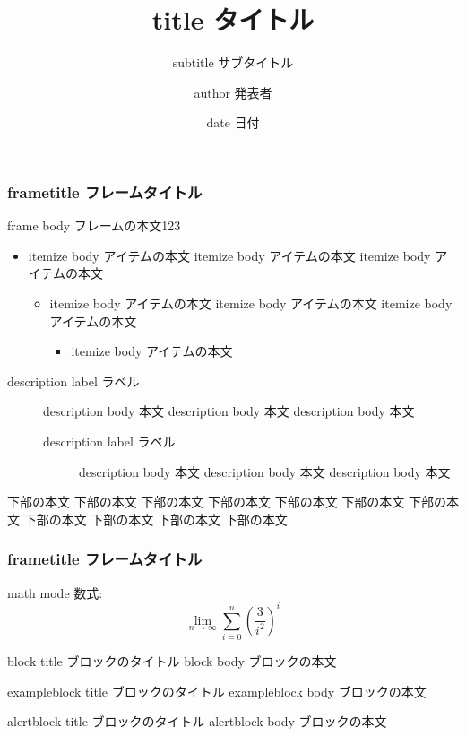 \documentclass[dvipdfmx,14pt,hyperref={hidelinks},t]{beamer}
\title{title タイトル}
\author{author 発表者}
\institute{institute 所属}
\subtitle{subtitle サブタイトル}
\date{date 日付}
\begin{document}
\begin{frame}[plain]
  \titlepage
\end{frame}

\begin{frame}
  \frametitle{frametitle フレームタイトル}
  frame body フレームの本文123
  \begin{itemize}
  \item itemize body アイテムの本文 itemize body アイテムの本文 itemize body アイテムの本文
    \begin{itemize}
    \item itemize body アイテムの本文 itemize body アイテムの本文 itemize body アイテムの本文
      \begin{itemize}
      \item  itemize body アイテムの本文
      \end{itemize}
    \end{itemize}
  \end{itemize}
  \begin{description}
  \item[description label ラベル] description body 本文 description body 本文 description body 本文
    \begin{description}
    \item[description label ラベル] description body 本文 description body 本文 description body 本文
    \end{description}
  \end{description}
  下部の本文 下部の本文 下部の本文 下部の本文 下部の本文 下部の本文 下部の本文 下部の本文 下部の本文 下部の本文 下部の本文
\end{frame}

\begin{frame}[fragile]
  \frametitle{frametitle フレームタイトル}
  math mode 数式:
  \[
    \lim_{n\to\infty}\sum_{i=0}^{n} \left(\frac{3}{i^2}\right)^i
  \]
  \begin{block}{block title ブロックのタイトル}
    block body ブロックの本文
  \end{block}
  \begin{exampleblock}{exampleblock title ブロックのタイトル}
    exampleblock body ブロックの本文
  \end{exampleblock}
  \begin{alertblock}{alertblock title ブロックのタイトル}
    alertblock body ブロックの本文
  \end{alertblock}
\end{frame}
\end{document}
